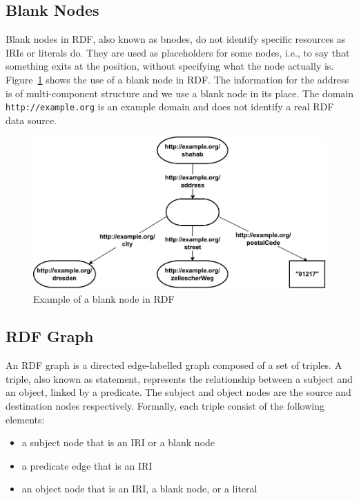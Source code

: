 \subsection{Blank Nodes}
Blank nodes in RDF, also known as bnodes, do not identify specific resources as IRIs or literals do. They are used as placeholders for some nodes, i.e., to say that something exits at the position, without specifying what the node actually is. Figure~\ref{fig:3} shows the use of a blank node in RDF. The information for the address is of multi-component structure and we use a blank node in its place. The domain \texttt{http://example.org} is an example domain and does not identify a real RDF data source.

\begin{figure}[h]
  \centering
  \includegraphics[width=0.80\linewidth]{images/blank_node.drawio.pdf}
  \caption{Example of a blank node in RDF}
  \label{fig:3}
\end{figure}

\subsection{RDF Graph}
\label{subsec:rdf-graph}
\begin{definition}	
An RDF graph is a directed edge-labelled graph composed of a set of triples. A triple, also known as statement, represents the relationship between a subject and an object, linked by a predicate. The subject and object nodes are the source and destination nodes respectively. Formally, each triple consist of the following elements:   

\begin{itemize}
	\item a subject node that is an IRI or a blank node
	\item a predicate edge that is an IRI
	\item an object node that is an IRI, a blank node, or a literal
\end{itemize}	

\end{definition}

